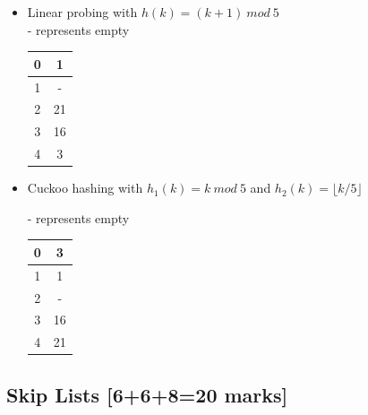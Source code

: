\documentclass[12pt]{article}
\begin{document}
\begin{itemize}
\item Linear probing with $h(k) = (k+1)~mod~5$\\

- represents empty\\
\begin{tabular}{c|c|}
  \hline
  0 & 1\\
  \hline
  1 & -\\
  \hline
  2 & 21\\
  \hline
  3 & 16\\
  \hline
  4 & 3\\
  \hline
\end{tabular}

\item  Cuckoo hashing with $h_1(k) = k~mod~5$ and $h_2(k) =\lfloor k/5 \rfloor$

- represents empty\\
\begin{tabular}{c|c|}
  \hline
  0 & 3\\
  \hline
  1 & 1\\
  \hline
  2 & -\\
  \hline
  3 & 16\\
  \hline
  4 & 21\\
  \hline
\end{tabular}

\end{itemize}

\subsection{Skip Lists [6+6+8=20 marks]}
\end{document}

